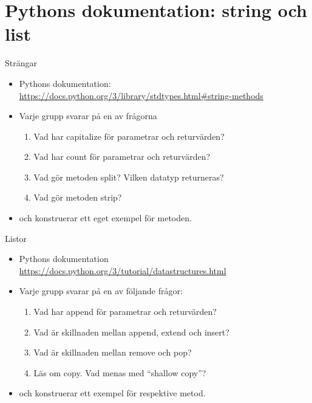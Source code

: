 \mode*

\section[Dokumentation]{Pythons dokumentation: string och list}

\begin{frame}
  \begin{block}{Strängar}
    \begin{itemize}
      \item Pythons dokumentation:
        \url{https://docs.python.org/3/library/stdtypes.html\#string-methods}
    \end{itemize}
  \end{block}

  \begin{exercise}[Strängar]
    \begin{itemize}
      \item Varje grupp svarar på en av frågorna
        \begin{enumerate}
          \item Vad har capitalize för parametrar och returvärden?
          \item Vad har count för parametrar och returvärden?
          \item Vad gör metoden split? Vilken datatyp returneras?
          \item Vad gör metoden strip?
        \end{enumerate}
      \item och konstruerar ett eget exempel för metoden.
    \end{itemize}
  \end{exercise}
\end{frame}

\begin{frame}
  \begin{block}{Listor}
    \begin{itemize}
      \item Pythons dokumentation
        \url{https://docs.python.org/3/tutorial/datastructures.html}
    \end{itemize}
  \end{block}

  \begin{exercise}[Listor]
    \begin{itemize}
      \item Varje grupp svarar på en av följande frågor:
        \begin{enumerate}
          \item Vad har append för parametrar och returvärden?
          \item Vad är skillnaden mellan append, extend och insert?
          \item Vad är skillnaden mellan remove och pop?
          \item Läs om copy. Vad menas med \enquote{shallow copy}?
        \end{enumerate}
      \item och konstruerar ett exempel för respektive metod.
    \end{itemize}
  \end{exercise}
\end{frame}

